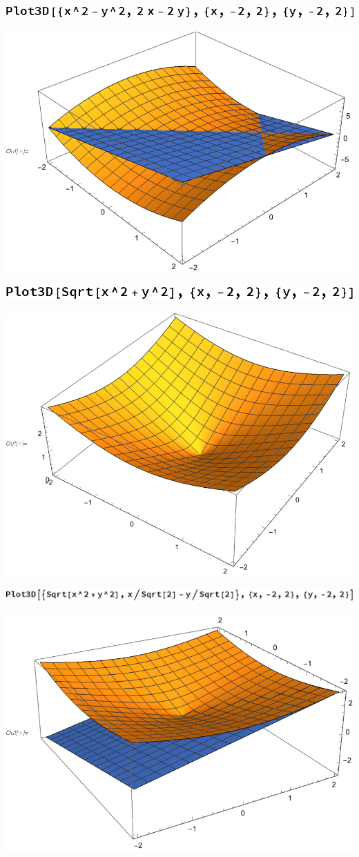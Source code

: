 \documentclass{article}
\begin{document}
\includegraphics{gr_gr15.eps}

\includegraphics{gr_gr16.eps}

\includegraphics{gr_gr17.eps}

\includegraphics{gr_gr18.eps}

\includegraphics{gr_gr19.eps}

\includegraphics{gr_gr20.eps}
\end{document}
